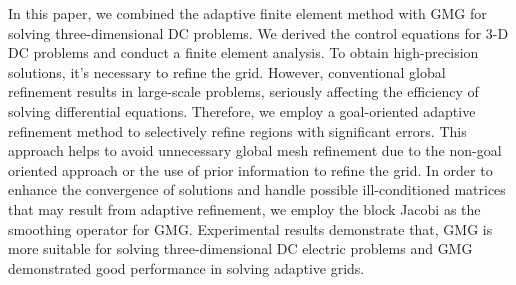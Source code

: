 \documentclass[extra, referee]{gji}
\begin{document}
In this paper, we combined the adaptive finite element method  with GMG for
solving three-dimensional DC problems. We derived the control equations for 3-D
DC problems and conduct a finite element analysis. To obtain high-precision
solutions, it's necessary to refine the grid. However, conventional global
refinement results in large-scale problems, seriously affecting the efficiency
of solving differential equations. Therefore, we employ a goal-oriented adaptive
refinement method \citep{Ren2013,Wu2023,Becker2022} to selectively refine
regions with significant errors. This approach helps to avoid unnecessary global
mesh refinement due to the non-goal oriented approach or the use of prior
information to refine the grid. In order to enhance the convergence of solutions
and handle possible ill-conditioned matrices that may result from adaptive
refinement, we employ the block Jacobi \citep{Hoagland2021,Anzt2017,Yang2023a}
as the smoothing operator for GMG. Experimental results demonstrate that, GMG is
more suitable for solving three-dimensional DC electric problems and GMG
demonstrated good performance in solving adaptive grids.



\end{document}
